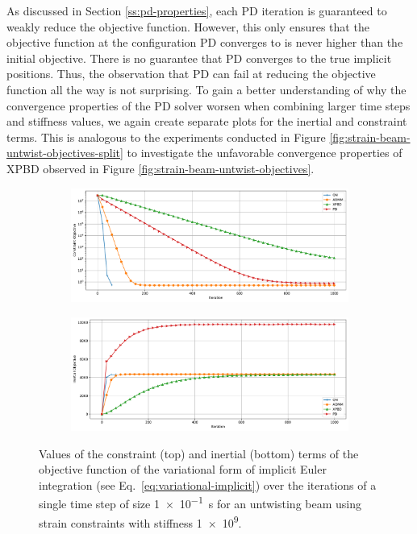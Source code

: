 As discussed in Section \ref{ss:pd-properties}, each PD iteration is guaranteed to weakly reduce the objective function. However, this only ensures that the objective function 
at the configuration PD converges to is never higher than the initial objective. There is no guarantee that 
PD converges to the true implicit positions. Thus, the observation that PD can fail at reducing the objective function all the way is not surprising. To gain a better 
understanding of why the convergence properties of the PD solver worsen when combining larger time steps and stiffness values, we again create separate plots for the 
inertial and constraint terms. This is analogous to the experiments conducted in Figure \ref{fig:strain-beam-untwist-objectives-split} to investigate 
the unfavorable convergence properties of XPBD observed in Figure \ref{fig:strain-beam-untwist-objectives}. 

\begin{figure}[t]
    \centering
    \begin{subfigure}{\textwidth}
        \includegraphics[width=\linewidth]{figures/strain_beam_untwist_constraintObjectives_large_ts.pdf}
    \end{subfigure}
    \begin{subfigure}{\textwidth}
        \includegraphics[width=\linewidth]{figures/strain_beam_untwist_inertialObjectives_large_ts.pdf}
    \end{subfigure}
    \caption{Values of the constraint (top) and inertial (bottom) terms of the objective function of the variational form of implicit Euler integration 
        (see Eq.\ \ref{eq:variational-implicit}) over the iterations of a single time step of size \SI{1e-1}{\second} for an untwisting beam using strain constraints with 
    stiffness \num{1e9}.}
    \label{fig:strain-beam-untwist-objectives-split-large-ts}
\end{figure}

